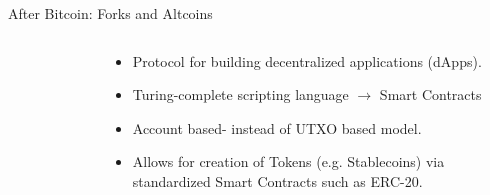 \documentclass[]{beamer}
\begin{document}
\begin{frame}{After Bitcoin: Forks and Altcoins}
	\begin{columns}
			\begin{figure}
			\end{figure}
		\vspace{0.5em}
		\begin{small}
			\begin{itemize}
				\item Protocol for building decentralized applications (dApps).
				\item Turing-complete scripting language $\rightarrow$ Smart Contracts
				\item Account based- instead of UTXO based model.
				\item Allows for creation of Tokens (e.g. Stablecoins) via standardized Smart Contracts such as ERC-20.
			\end{itemize}
		\end{small}
	\end{columns}	
\end{frame}
\end{document}
